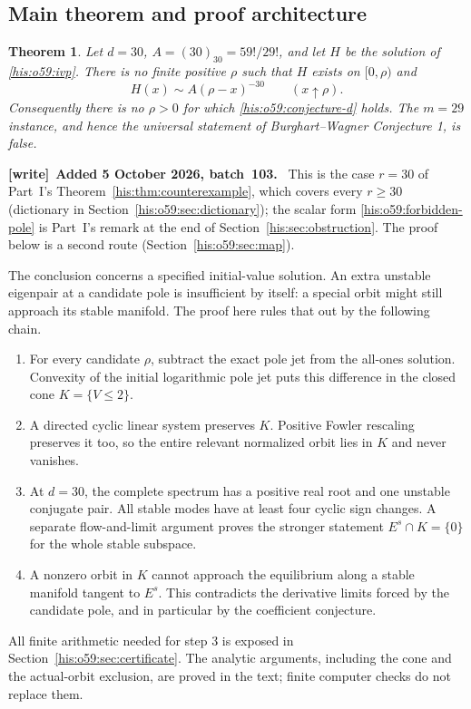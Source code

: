 \documentclass[11pt]{article}
\newtheorem{theorem}{Theorem}[section]
\theoremstyle{remark}\newtheorem{remark}[theorem]{Remark}
\numberwithin{equation}{section}
\newenvironment{writenote}[1][]{\par\smallskip\begingroup\small
 \noindent\textbf{[write]}\if\relax\detokenize{#1}\relax\else~\textbf{#1.}\fi\ }%
 {\par\endgroup\smallskip}
\begin{document}
\subsection{Main theorem and proof architecture}
\begin{theorem}\label{his:o59:main}
Let $d=30$, $A=(30)_{30}=59!/29!$, and let $H$ be the solution of
\eqref{his:o59:ivp}. There is no finite positive $\rho$ such that $H$ exists
on $[0,\rho)$ and
\begin{equation}\label{his:o59:forbidden-pole}
H(x)\sim A(\rho-x)^{-30}\qquad(x\uparrow\rho).
\end{equation}
Consequently there is no $\rho>0$ for which \eqref{his:o59:conjecture-d}
holds. The $m=29$ instance, and hence the universal statement of
Burghart--Wagner Conjecture 1, is false.
\end{theorem}
\begin{writenote}[Added 5 October 2026, batch~103]
This is the case $r=30$ of Part~I's Theorem~\ref{his:thm:counterexample}, which covers every $r\ge30$ (dictionary in Section~\ref{his:o59:sec:dictionary}); the scalar form \eqref{his:o59:forbidden-pole} is Part~I's remark at the end of Section~\ref{his:sec:obstruction}. The proof below is a second route (Section~\ref{his:o59:sec:map}).
\end{writenote}


The conclusion concerns a specified initial-value solution. An extra
unstable eigenpair at a candidate pole is insufficient by itself: a
special orbit might still approach its stable manifold. The proof here
rules that out by the following chain.
\begin{enumerate}[label=\arabic*.]
\item For every candidate $\rho$, subtract the exact pole jet from
the all-ones solution. Convexity of the initial logarithmic pole jet
puts this difference in the closed cone $K=\{V\le2\}$.
\item A directed cyclic linear system preserves $K$. Positive Fowler
rescaling preserves it too, so the entire relevant normalized orbit
lies in $K$ and never vanishes.
\item At $d=30$, the complete spectrum has a positive real root and
one unstable conjugate pair. All stable modes have at least four
cyclic sign changes. A separate flow-and-limit argument proves the
stronger statement $E^s\cap K=\{0\}$ for the whole stable subspace.
\item A nonzero orbit in $K$ cannot approach the equilibrium along
a stable manifold tangent to $E^s$. This contradicts the derivative
limits forced by the candidate pole, and in particular by the
coefficient conjecture.
\end{enumerate}
All finite arithmetic needed for step 3 is exposed in
Section~\ref{his:o59:sec:certificate}. The analytic arguments, including the
cone and the actual-orbit exclusion, are proved in the text; finite
computer checks do not replace them.
\end{document}

